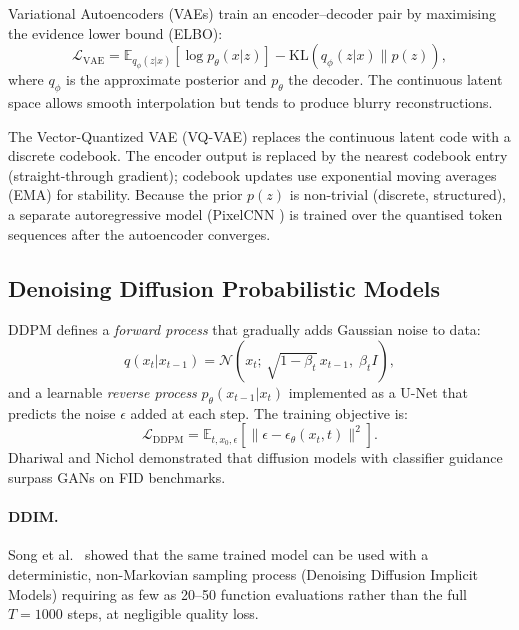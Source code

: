 \documentclass[12pt,a4paper]{article}
\begin{document}
Variational Autoencoders (VAEs) \cite{vae} train an encoder--decoder pair by
maximising the evidence lower bound (ELBO):
\begin{equation}
  \mathcal{L}_{\text{VAE}} = \mathbb{E}_{q_\phi(z|x)}[\log p_\theta(x|z)]
                            - \mathrm{KL}(q_\phi(z|x) \| p(z)),
\end{equation}
where $q_\phi$ is the approximate posterior and $p_\theta$ the decoder.
The continuous latent space allows smooth interpolation but tends to produce
blurry reconstructions.

The Vector-Quantized VAE (VQ-VAE) \cite{vqvae} replaces the continuous latent
code with a discrete codebook.  The encoder output is replaced by the nearest
codebook entry (straight-through gradient); codebook updates use exponential
moving averages (EMA) for stability.  Because the prior $p(z)$ is non-trivial
(discrete, structured), a separate autoregressive model (PixelCNN \cite{pixelcnn})
is trained over the quantised token sequences after the autoencoder converges.

\subsection{Denoising Diffusion Probabilistic Models}

DDPM \cite{ddpm} defines a \emph{forward process} that gradually adds Gaussian
noise to data:
\begin{equation}
  q(x_t | x_{t-1}) = \mathcal{N}(x_t;\, \sqrt{1-\beta_t}\, x_{t-1},\; \beta_t I),
\end{equation}
and a learnable \emph{reverse process} $p_\theta(x_{t-1}|x_t)$ implemented as
a U-Net that predicts the noise $\epsilon$ added at each step.  The training
objective is:
\begin{equation}
  \mathcal{L}_{\text{DDPM}} = \mathbb{E}_{t,x_0,\epsilon}
    \left[\|\epsilon - \epsilon_\theta(x_t, t)\|^2\right].
\end{equation}
Dhariwal and Nichol \cite{diffusionbeatsgan} demonstrated that diffusion models
with classifier guidance surpass GANs on FID benchmarks.

\paragraph{DDIM.}
Song et al.\ \cite{ddim} showed that the same trained model can be used with a
deterministic, non-Markovian sampling process (Denoising Diffusion Implicit
Models) requiring as few as 20--50 function evaluations rather than the full
$T=1000$ steps, at negligible quality loss.
\end{document}
